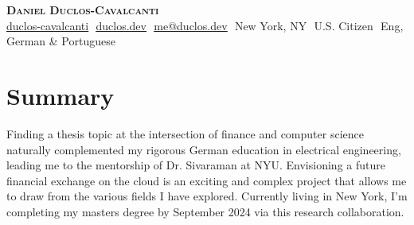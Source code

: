 \documentclass[letterpaper,11pt]{article}
\begin{document}
\begin{flushright}
\end{flushright}

\vspace{-5pt}

\begin{center}
    \textbf{\Huge \scshape Daniel Duclos-Cavalcanti} \\ \vspace{8pt}
    \small 
    \href{https://github.com/duclos-cavalcanti}{\underline{duclos-cavalcanti}} $  $
    \href{https://www.duclos.dev}{\underline{duclos.dev}} $  $
    \href{mailto:me@duclos.dev}{\underline{me@duclos.dev}} $ $
    New York, NY $ $
    U.S. Citizen $ $
    Eng, German \& Portuguese
\end{center}

\section{Summary}


\small{
Finding a thesis topic at the intersection of finance and computer science 
naturally complemented my rigorous German education in electrical engineering, 
leading me to the mentorship of Dr. Sivaraman at NYU. Envisioning a future 
financial exchange on the cloud is an exciting and 
complex project that allows me to draw from the various fields I have explored.
Currently living in New York, I'm completing my masters degree by September 2024 via this research 
collaboration.
}
\end{document}
